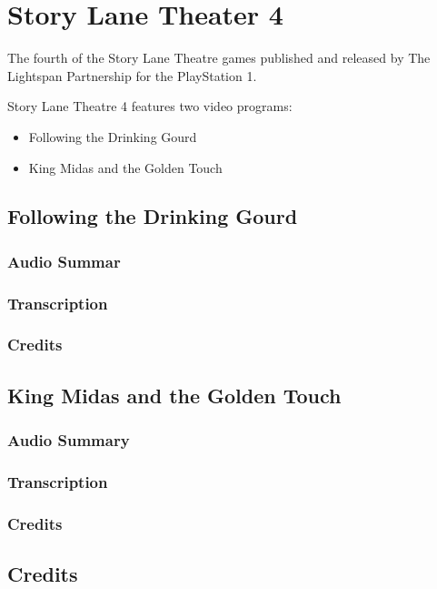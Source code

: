\chapter{Story Lane Theater 4}


The fourth of the Story Lane Theatre games published and released by The Lightspan Partnership for the PlayStation 1.

Story Lane Theatre 4 features two video programs:

\begin{itemize}
    \item Following the Drinking Gourd
    \item King Midas and the Golden Touch
\end{itemize}

\clearpage
\newpage

\section{Following the Drinking Gourd}

\subsection{Audio Summar}

\subsection{Transcription}

\subsection{Credits}

\section{King Midas and the Golden Touch}

\subsection{Audio Summary}

\subsection{Transcription}

\subsection{Credits}

\section{Credits}